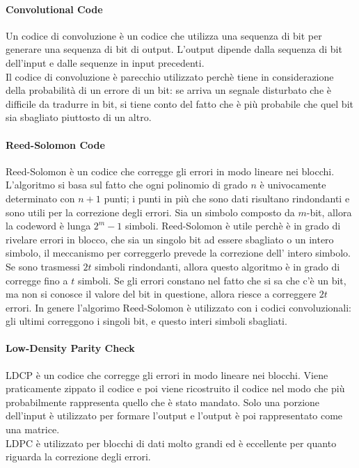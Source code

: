 \documentclass{article}
\begin{document}
\paragraph{Convolutional Code}
Un codice di convoluzione è un codice che utilizza una sequenza di bit per
generare una sequenza di bit di output. L'output dipende dalla sequenza di bit
dell'input e dalle sequenze in input precedenti.\\
Il codice di convoluzione è parecchio utilizzato perchè tiene in considerazione
della probabilità di un errore di un bit: se arriva un segnale disturbato che è
difficile da tradurre in bit, si tiene conto del fatto che è più probabile che
quel bit sia sbagliato piuttosto di un altro.

\paragraph{Reed-Solomon Code}
Reed-Solomon è un codice che corregge gli errori in modo lineare nei blocchi.
L'algoritmo si basa sul fatto che ogni polinomio di grado $n$ è univocamente
determinato con $n+1$ punti; i punti in più che sono dati risultano rindondanti
e sono utili per la correzione degli errori. Sia un simbolo composto da $m$-bit,
allora la codeword è lunga $2^m-1$ simboli. Reed-Solomon è utile perchè è in
grado di rivelare errori in blocco, che sia un singolo bit ad essere sbagliato o
un intero simbolo, il meccanismo per correggerlo prevede la correzione dell'
intero simbolo. Se sono trasmessi $2t$ simboli rindondanti, allora questo
algoritmo è in grado di corregge fino a $t$ simboli. Se gli errori constano nel
fatto che si sa che c'è un bit, ma non si conosce il valore del bit in questione,
allora riesce a correggere $2t$ errori. In genere l'algorimo Reed-Solomon è
utilizzato con i codici convoluzionali: gli ultimi correggono i singoli bit, e
questo interi simboli sbagliati.

\paragraph{Low-Density Parity Check} LDCP è un codice che corregge gli errori in
modo lineare nei blocchi. Viene praticamente zippato il codice e poi viene
ricostruito il codice nel modo che più probabilmente rappresenta quello che è
stato mandato. Solo una porzione dell'input è utilizzato per formare l'output e
l'output è poi rappresentato come una matrice.\\
LDPC è utilizzato per blocchi di dati molto grandi ed è eccellente per quanto
riguarda la correzione degli errori.
\end{document}
